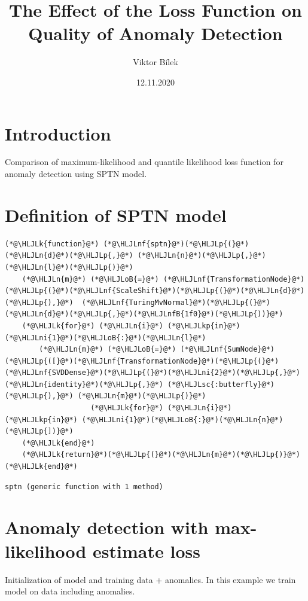 \documentclass[12pt,a4paper]{article}
\title{ The Effect of the Loss Function on Quality of Anomaly Detection }
\author{ Viktor Bílek }
\date{ 12.11.2020 }
\newcommand{\HLJLk}[1]{\textcolor[RGB]{148,91,176}{\textbf{#1}}}
\newcommand{\HLJLkp}[1]{\textcolor[RGB]{148,91,176}{\textbf{#1}}}
\newcommand{\HLJLn}[1]{#1}
\newcommand{\HLJLnf}[1]{\textcolor[RGB]{66,102,213}{#1}}
\newcommand{\HLJLsc}[1]{\textcolor[RGB]{201,61,57}{#1}}
\newcommand{\HLJLnfB}[1]{\textcolor[RGB]{59,151,46}{#1}}
\newcommand{\HLJLni}[1]{\textcolor[RGB]{59,151,46}{#1}}
\newcommand{\HLJLoB}[1]{\textcolor[RGB]{102,102,102}{\textbf{#1}}}
\newcommand{\HLJLp}[1]{#1}
\begin{document}
\maketitle

\section{Introduction}
Comparison of maximum-likelihood and quantile likelihood loss function for anomaly detection using SPTN model.



\section{Definition of SPTN model}

\begin{lstlisting}
(*@\HLJLk{function}@*) (*@\HLJLnf{sptn}@*)(*@\HLJLp{(}@*)(*@\HLJLn{d}@*)(*@\HLJLp{,}@*) (*@\HLJLn{n}@*)(*@\HLJLp{,}@*) (*@\HLJLn{l}@*)(*@\HLJLp{)}@*)
	(*@\HLJLn{m}@*) (*@\HLJLoB{=}@*) (*@\HLJLnf{TransformationNode}@*)(*@\HLJLp{(}@*)(*@\HLJLnf{ScaleShift}@*)(*@\HLJLp{(}@*)(*@\HLJLn{d}@*)(*@\HLJLp{),}@*)  (*@\HLJLnf{TuringMvNormal}@*)(*@\HLJLp{(}@*)(*@\HLJLn{d}@*)(*@\HLJLp{,}@*)(*@\HLJLnfB{1f0}@*)(*@\HLJLp{))}@*)
	(*@\HLJLk{for}@*) (*@\HLJLn{i}@*) (*@\HLJLkp{in}@*) (*@\HLJLni{1}@*)(*@\HLJLoB{:}@*)(*@\HLJLn{l}@*)
		(*@\HLJLn{m}@*) (*@\HLJLoB{=}@*) (*@\HLJLnf{SumNode}@*)(*@\HLJLp{([}@*)(*@\HLJLnf{TransformationNode}@*)(*@\HLJLp{(}@*)(*@\HLJLnf{SVDDense}@*)(*@\HLJLp{(}@*)(*@\HLJLni{2}@*)(*@\HLJLp{,}@*) (*@\HLJLn{identity}@*)(*@\HLJLp{,}@*) (*@\HLJLsc{:butterfly}@*)(*@\HLJLp{),}@*) (*@\HLJLn{m}@*)(*@\HLJLp{)}@*)
					(*@\HLJLk{for}@*) (*@\HLJLn{i}@*) (*@\HLJLkp{in}@*) (*@\HLJLni{1}@*)(*@\HLJLoB{:}@*)(*@\HLJLn{n}@*)(*@\HLJLp{])}@*)
	(*@\HLJLk{end}@*)
	(*@\HLJLk{return}@*)(*@\HLJLp{(}@*)(*@\HLJLn{m}@*)(*@\HLJLp{)}@*)
(*@\HLJLk{end}@*)
\end{lstlisting}

\begin{lstlisting}
sptn (generic function with 1 method)
\end{lstlisting}


\section{Anomaly detection with max-likelihood estimate loss}
Initialization of model and training data + anomalies. In this example we train model on data including anomalies.
\end{document}
